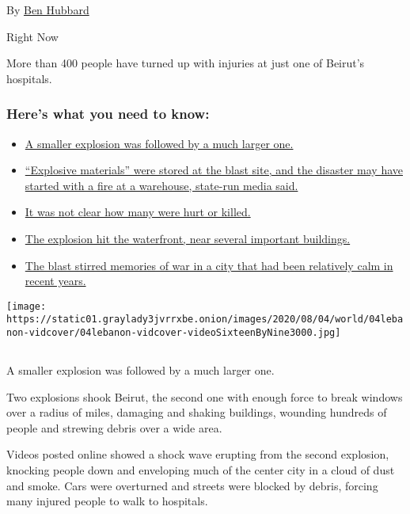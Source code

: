 By \href{https://www.nytimes3xbfgragh.onion/by/ben-hubbard}{Ben Hubbard}

Right Now

More than 400 people have turned up with injuries at just one of
Beirut's hospitals.

\hypertarget{heres-what-you-need-to-know}{%
\subsubsection{Here's what you need to
know:}\label{heres-what-you-need-to-know}}

\begin{itemize}
\tightlist
\item
  \protect\hyperlink{link-12ef1c10}{A smaller explosion was followed by
  a much larger one.}
\item
  \protect\hyperlink{link-4ec3be73}{``Explosive materials'' were stored
  at the blast site, and the disaster may have started with a fire at a
  warehouse, state-run media said.}
\item
  \protect\hyperlink{link-26e5e8b0}{It was not clear how many were hurt
  or killed.}
\item
  \protect\hyperlink{link-1202af77}{The explosion hit the waterfront,
  near several important buildings.}
\item
  \protect\hyperlink{link-3a2e264f}{The blast stirred memories of war in
  a city that had been relatively calm in recent years.}
\end{itemize}

\texttt{[image: https://static01.graylady3jvrrxbe.onion/images/2020/08/04/world/04lebanon-vidcover/04lebanon-vidcover-videoSixteenByNine3000.jpg]}

\subsection{}

A smaller explosion was followed by a much larger one.

Two explosions shook Beirut, the second one with enough force to break
windows over a radius of miles, damaging and shaking buildings, wounding
hundreds of people and strewing debris over a wide area.

Videos posted online showed a shock wave erupting from the second
explosion, knocking people down and enveloping much of the center city
in a cloud of dust and smoke. Cars were overturned and streets were
blocked by debris, forcing many injured people to walk to hospitals.

